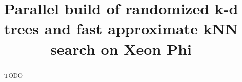 \documentclass[letterpaper]{article}
\title{Parallel build of randomized k-d trees and fast approximate kNN search on Xeon Phi}
\begin{document}
\maketitle

\begin{abstract}
  TODO
\end{abstract}






% 



\end{document}
